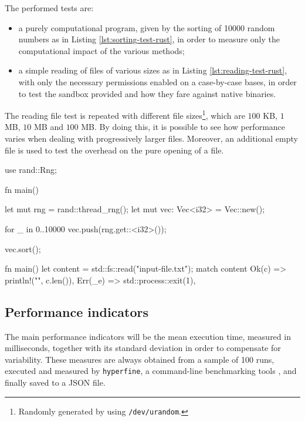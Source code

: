 The performed tests are:
\begin{itemize}
  \item a purely computational program, given by the sorting of 10000 random numbers as in Listing \ref{lst:sorting-test-rust},
        in order to measure only the computational impact of the various methods;
  \item a simple reading of files of various sizes as in Listing \ref{lst:reading-test-rust}, with only the necessary permissions enabled on
        a case-by-case bases, in order to test the sandbox provided and how they fare against native binaries.
\end{itemize}

The reading file test is repeated with different file sizes\footnote{Randomly generated by using \texttt{/dev/urandom}.},
which are $100$ KB, $1$ MB, $10$ MB and $100$ MB. By doing this, it is possible to see how performance
varies when dealing with progressively larger files. Moreover, an additional empty file is used to
test the overhead on the pure opening of a file.

\vspace*{0.5cm}
\begin{code}[language=Rust, caption=The ``sorting program''., label=lst:sorting-test-rust]
use rand::Rng;

fn main() {
  let mut rng = rand::thread_rng();
  let mut vec: Vec<i32> = Vec::new();

  for _ in 0..10000 {
    vec.push(rng.get::<i32>());
  }

  vec.sort();
}
\end{code}

\begin{code}[language=Rust, caption=The ``reading program''., label=lst:reading-test-rust]
fn main() {
  let content = std::fs::read("input-file.txt");
  match content {
      Ok(c) => println!("{}", c.len()),
      Err(_e) => std::process::exit(1),
  }
}
\end{code}

\subsection{Performance indicators}

The main performance indicators will be the mean execution time, measured in milliseconds, together with its
standard deviation in order to compensate for variability.
These measures are always obtained from a sample of 100 runs, executed and measured by \texttt{hyperfine},
a command-line benchmarking tools \cite{hyperfine}, and finally saved to a
JSON file.

